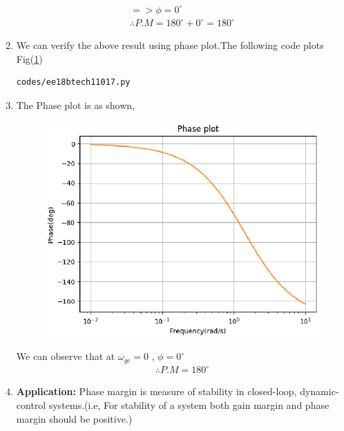 \begin{enumerate}[label=\thesection.\arabic*.,ref=\thesection.\theenumi]
\begin{align}
=> \phi=0^{\circ}
\\
\therefore P.M=180^{\circ}+0^{\circ}=180^{\circ}
\end{align}

\item
We can verify the above result using phase plot.The following code plots Fig(\ref{fig:ee18btech11017})
\begin{lstlisting}
codes/ee18btech11017.py
\end{lstlisting}
\item
The Phase plot is as shown,
\begin{figure}[!h]
  \includegraphics[width=\columnwidth]{./figures/ee18btech11017.eps}
  \caption{}
  \label{fig:ee18btech11017}
\end{figure}
We can observe that at $\omega_{gc}=0$ , $\phi=0^{\circ}$
\\
\begin{align}
\therefore P.M=180^{\circ}
\end{align}
\item
\textbf{Application:} 
Phase margin is measure of stability in closed-loop, dynamic-control systems.(i.e, For stability of a system both gain margin and phase margin should be positive.)
\end{enumerate}
